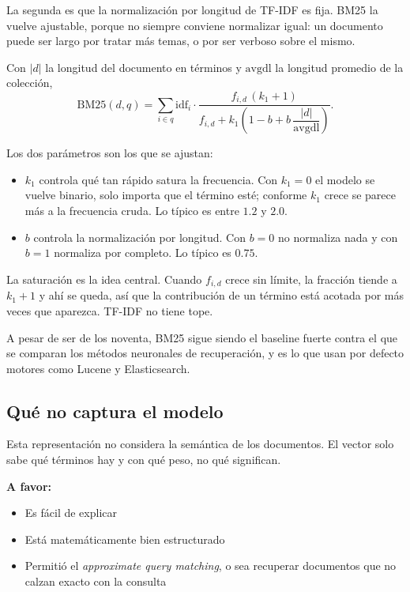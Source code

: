 \documentclass[11pt,letterpaper]{article}
\begin{document}
La segunda es que la normalización por longitud de TF-IDF es fija.
BM25 la vuelve ajustable, porque no siempre conviene normalizar
igual: un documento puede ser largo por tratar más temas, o por ser
verboso sobre el mismo.

Con $|d|$ la longitud del documento en términos y
$\mathrm{avgdl}$ la longitud promedio de la colección,
\[
    \mathrm{BM25}(d, q) = \sum_{i \in q} \mathrm{idf}_i \cdot
    \frac{f_{i,d}\,(k_1 + 1)}
         {f_{i,d} + k_1\left(1 - b + b\,\dfrac{|d|}{\mathrm{avgdl}}\right)} .
\]

Los dos parámetros son los que se ajustan:

\begin{itemize}[itemsep=0.2em]
    \item $k_1$ controla qué tan rápido satura la frecuencia. Con
          $k_1 = 0$ el modelo se vuelve binario, solo importa que el
          término esté; conforme $k_1$ crece se parece más a la
          frecuencia cruda. Lo típico es entre $1.2$ y $2.0$.
    \item $b$ controla la normalización por longitud. Con $b = 0$ no
          normaliza nada y con $b = 1$ normaliza por completo. Lo
          típico es $0.75$.
\end{itemize}

\begin{idea}
    La saturación es la idea central. Cuando $f_{i,d}$ crece sin
    límite, la fracción tiende a $k_1 + 1$ y ahí se queda, así que la
    contribución de un término está acotada por más veces que
    aparezca. TF-IDF no tiene tope.
\end{idea}

A pesar de ser de los noventa, BM25 sigue siendo el baseline fuerte
contra el que se comparan los métodos neuronales de recuperación, y
es lo que usan por defecto motores como Lucene y Elasticsearch.


\subsection*{Qué no captura el modelo}

Esta representación no considera la semántica de los documentos. El
vector solo sabe qué términos hay y con qué peso, no qué significan.

\textbf{A favor:}
\begin{itemize}[itemsep=0.1em]
    \item Es fácil de explicar
    \item Está matemáticamente bien estructurado
    \item Permitió el \textit{approximate query matching}, o sea
          recuperar documentos que no calzan exacto con la consulta
\end{itemize}
\end{document}
